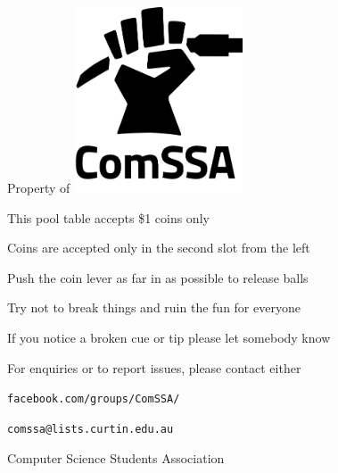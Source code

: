 \documentclass[a4paper]{minimal}
\begin{document}
\fontsize{35.83pt}{1em}
\selectfont

\begin{center}
	Property of
	\hspace{1cm}
	\raisebox{-.5\height}
	{\includegraphics[width=5cm]{logo/comssalogo_black_large.png}}
\end{center}

\fontsize{22.88pt}{0.91em}
\selectfont

\begin{list}{\textbullet\hspace{0.5em}}{}
	\item This pool table accepts \$1 coins only
	\item Coins are accepted only in the second slot from the left
	\item Push the coin lever as far in as possible to release balls
	\item Try not to break things and ruin the fun for everyone
	\item If you notice a broken cue or tip please let somebody know
	\item For enquiries or to report issues, please contact either
	\begin{list}{\hspace{1.5em}\textbullet\hspace{0.5em}}{}
		\item \texttt{facebook.com/groups/ComSSA/}
		\item \texttt{comssa@lists.curtin.edu.au}
	\end{list}
\end{list}

\fontsize{12pt}{1em}
\selectfont

\begin{center}
	Computer Science Students Association
\end{center}
\end{document}
